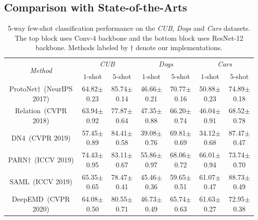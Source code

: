 \documentclass[letterpaper]{article} %
\begin{document}
\subsection{Comparison with State-of-the-Arts}
\begin{table}[!ht]
\setlength\tabcolsep{4.8pt}
\centering
\caption{5-way few-shot classification performance on the \textit{CUB}, \textit{Dogs} and \textit{Cars} datasets. {The top block uses Conv-4 backbone and the bottom block uses ResNet-12 backbone.} Methods labeled by $\dag$ denote our implementations.}
\label{tab:1}
\begin{tabular}{ccccccc}
\toprule[1pt]
\multirow{2}{*}{\it{Method}}      
& \multicolumn{2}{c}{\it{CUB}} 
& \multicolumn{2}{c}{\it{Dogs}}  
& \multicolumn{2}{c}{\it{Cars}}  \\ 
                                                   
&\multicolumn{1}{c}{$1$-shot} 
& \multicolumn{1}{c}{$5$-shot}  
& \multicolumn{1}{c}{$1$-shot}  
& \multicolumn{1}{c}{$5$-shot}  
& \multicolumn{1}{c}{$1$-shot} 
& \multicolumn{1}{c}{$5$-shot} \\ \midrule


ProtoNet$\dag$~(NeurIPS 2017)%
& 64.82$\pm$0.23       
& 85.74$\pm$0.14          
& 46.66$\pm$0.21    
& 70.77$\pm$0.16  
& 50.88$\pm$0.23
& 74.89$\pm$0.18 \\ 

Relation~(CVPR 2018)%
& 63.94$\pm$0.92          
& 77.87$\pm$0.64           
& 47.35$\pm$0.88          
& 66.20$\pm$0.74            
& 46.04$\pm$0.91          
& 68.52$\pm$0.78 \\ 

DN4~(CVPR 2019)%
& 57.45$\pm$0.89
& 84.41$\pm$0.58
& 39.08$\pm$0.76
& 69.81$\pm$0.69
& 34.12$\pm$0.68
& {87.47$\pm$0.47} \\ 



PARN$\dag$~(ICCV 2019)%
& {74.43$\pm$0.95}    
& 83.11$\pm$0.67
& 55.86$\pm$0.97
& 68.06$\pm$0.72
& 66.01$\pm$0.94
& 73.74$\pm$0.70 \\


SAML~(ICCV 2019)%
& {65.35$\pm$0.65}    
& 78.47$\pm$0.41
& 45.46$\pm$0.36
& 59.65$\pm$0.51
& 61.07$\pm$0.47
& 88.73$\pm$0.49 \\

DeepEMD~(CVPR 2020)%
& 64.08$\pm$0.50
& 80.55$\pm$0.71
& 46.73$\pm$0.49
& 65.74$\pm$0.63
& 61.63$\pm$0.27
& 72.95$\pm$0.38 \\ 



\end{tabular}
\end{table}
\end{document}
